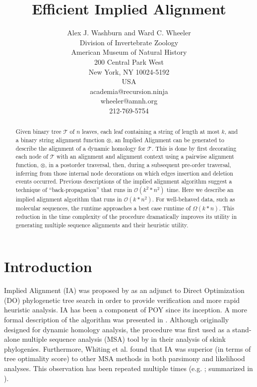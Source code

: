 \documentclass[11pt]{article}
\title{ \textbf{Efficient Implied Alignment}}
\author{Alex J. Washburn and Ward C. Wheeler\\
		Division of  Invertebrate Zoology\\
		American Museum of Natural History\\
		200 Central Park West\\
		New York, NY 10024-5192\\
		USA\\
		academia@recursion.ninja\\
		wheeler@amnh.org\\
		212-769-5754}
\begin{document}
\maketitle
\begin{abstract}
Given binary tree $\mathcal{T}$ of $n$ leaves, each leaf containing a string of length at most $k$, and a binary string alignment function $\otimes$, an Implied Alignment can be generated to describe the alignment of a dynamic homology for $\mathcal{T}$.
This is done by first decorating each node of $\mathcal{T}$ with an alignment and alignment context using a pairwise alignment function, $\otimes$, in a postorder traversal, then, during a subsequent pre-order traversal, inferring from those internal node decorations on which edges insertion and deletion events occurred.
Previous descriptions of the implied alignment algorithm suggest a technique of ``back-propagation'' that runs in $\mathcal{O}(k^2 * n^2)$ time.
Here we describe an implied alignment algorithm that runs in \textsc{$\mathcal{O}(k * n^2)$}.
For well-behaved data, such as molecular sequences, the runtime approaches a best case runtime of \textsc{$\Omega(k * n)$}.
This reduction in the time complexity of the procedure dramatically improves its utility in generating multiple sequence alignments and their heuristic utility.
\end{abstract}
\newpage
\tableofcontents
\newpage


\section{Introduction}
Implied Alignment (IA) was proposed by \cite{Wheeler2003} as an adjunct to Direct Optimization (DO) \citep{Wheeler1996,VaronandWheeler2012} phylogenetic tree search in order to provide verification and more rapid heuristic analysis.
IA has been a component of POY \citep{Wheeleretal2015, POY5} since its inception.
A more formal description of the algorithm was presented in \cite{Wheeleretal2006}.
Although originally designed for dynamic homology \citep{Wheeler2001} analysis, the procedure was first used as a stand-alone multiple sequence analysis (MSA) tool by \cite{WhitingAetal2006} in their analysis of skink phylogenies. 
Furthermore, Whiting et al. found that IA was superior (in terms of tree optimality score) to other MSA methods in both parsimony and likelihood analyses.
This observation has been repeated multiple times (e.g. \citealp{LindgrenandDaly2007, FordandWheeler2015}; summarized in \citealp{Wheeler2012}).
\end{document}
